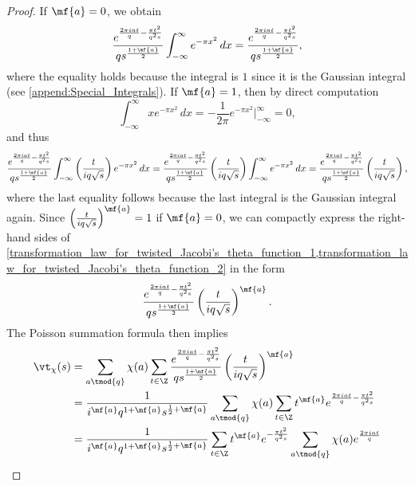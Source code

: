 \begin{proof}
        If $\mf{a} = 0$, we obtain
        \begin{equation}\label{transformation_law_for_twisted_Jacobi's_theta_function_1}
          \frac{e^{\frac{2\pi iat}{q}-\frac{\pi t^{2}}{q^{2}s}}}{qs^{\frac{1+\mf{a}}{2}}}\int_{-\infty}^{\infty}e^{-\pi x^{2}}\,dx = \frac{e^{\frac{2\pi iat}{q}-\frac{\pi t^{2}}{q^{2}s}}}{qs^{\frac{1+\mf{a}}{2}}},
        \end{equation}
        where the equality holds because the integral is $1$ since it is the Gaussian integral (see \cref{append:Special_Integrals}). If $\mf{a} = 1$, then by direct computation
        \[
          \int_{-\infty}^{\infty}xe^{-\pi x^{2}}\,dx = -\frac{1}{2\pi}e^{-\pi x^{2}}\bigg|_{-\infty}^{\infty} = 0,
        \]
        and thus
        \begin{equation}\label{transformation_law_for_twisted_Jacobi's_theta_function_2}
          \frac{e^{\frac{2\pi iat}{q}-\frac{\pi t^{2}}{q^{2}s}}}{qs^{\frac{1+\mf{a}}{2}}}\int_{-\infty}^{\infty}\left(\frac{t}{iq\sqrt{s}}\right)e^{-\pi x^{2}}\,dx = \frac{e^{\frac{2\pi iat}{q}-\frac{\pi t^{2}}{q^{2}s}}}{qs^{\frac{1+\mf{a}}{2}}}\left(\frac{t}{iq\sqrt{s}}\right)\int_{-\infty}^{\infty}e^{-\pi x^{2}}\,dx = \frac{e^{\frac{2\pi iat}{q}-\frac{\pi t^{2}}{q^{2}s}}}{qs^{\frac{1+\mf{a}}{2}}}\left(\frac{t}{iq\sqrt{s}}\right),
        \end{equation}
        where the last equality follows because the last integral is the Gaussian integral again. Since $\left(\frac{t}{iq\sqrt{s}}\right)^{\mf{a}} = 1$ if $\mf{a} = 0$, we can compactly express the right-hand sides of \cref{transformation_law_for_twisted_Jacobi's_theta_function_1,transformation_law_for_twisted_Jacobi's_theta_function_2} in the form
        \[
          \frac{e^{\frac{2\pi iat}{q}-\frac{\pi t^{2}}{q^{2}s}}}{qs^{\frac{1+\mf{a}}{2}}}\left(\frac{t}{iq\sqrt{s}}\right)^{\mf{a}}.
        \]
        The Poisson summation formula then implies
        \begin{align*}
          \vt_{\chi}(s) &= \sum_{a \tmod{q}}\chi(a)\sum_{t \in \Z}\frac{e^{\frac{2\pi iat}{q}-\frac{\pi t^{2}}{q^{2}s}}}{qs^{\frac{1+\mf{a}}{2}}}\left(\frac{t}{iq\sqrt{s}}\right)^{\mf{a}} \\
          &= \frac{1}{i^{\mf{a}}q^{1+\mf{a}}s^{\frac{1}{2}+\mf{a}}}\sum_{a \tmod{q}}\chi(a)\sum_{t \in \Z}t^{\mf{a}}e^{\frac{2\pi iat}{q}-\frac{\pi t^{2}}{q^{2}s}} \\
          &= \frac{1}{i^{\mf{a}}q^{1+\mf{a}}s^{\frac{1}{2}+\mf{a}}}\sum_{t \in \Z}t^{\mf{a}}e^{-\frac{\pi t^{2}}{q^{2}s}}\sum_{a \tmod{q}}\chi(a)e^{\frac{2\pi i at}{q}} \\

\end{align*}
\end{proof}
